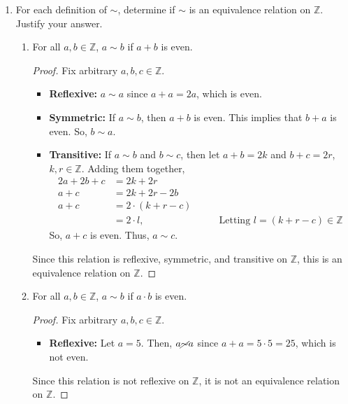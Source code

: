 \documentclass{article}
\begin{document}
\begin{enumerate}
	\item For each definition of $\sim$, determine if $\sim$ is an equivalence relation on $\mathbb{Z}$.  Justify your answer.
		\begin{enumerate}

			\item For all $a, b \in \mathbb{Z}$, $a \sim b$ if $a + b$ is even.
                    \begin{proof} Fix arbitrary $a, b, c \in \mathbb{Z}$.
                        \begin{itemize}
                            \item \textbf{Reflexive:}  $a \sim a$ since $a + a = 2a$, which is even.
                            \item \textbf{Symmetric:}  If $a \sim b$, then $a + b$ is even. This implies that $b + a$ is even. So, $b \sim a$.
                            \item \textbf{Transitive:} If $a \sim b$ and $b \sim c$, then let $a + b = 2k$ and $b + c = 2r$, $k, r\in \mathbb{Z}$. Adding them together,
                            \begin{alignat*}{2}
                                a + 2b + c &= 2k + 2r \\
                                a + c &= 2k + 2r - 2b \\
                                a + c &= 2\cdot(k + r - c) \\
                                &= 2\cdot l\text{,}&\qquad \textrm{Letting $l = (k + r - c)\in\mathbb{Z}$}
                            \end{alignat*}
                            So, $a + c$ is even. Thus, $a \sim c$.
                        \end{itemize}
                        Since this relation is reflexive, symmetric, and transitive on $\mathbb{Z}$, this is an equivalence relation on $\mathbb{Z}$.
                    \end{proof}

			\item For all $a, b \in \mathbb{Z}$, $a \sim b$ if $a \cdot b$ is even.
                    \begin{proof} Fix arbitrary $a, b, c \in \mathbb{Z}$.
                        \begin{itemize}
                            \item \textbf{Reflexive:} Let $a = 5$. Then, $a \cancel{\sim} a$ since $a + a = 5 \cdot 5 = 25$, which is not even.
                        \end{itemize}
                        Since this relation is not reflexive on $\mathbb{Z}$, it is not an equivalence relation on $\mathbb{Z}$.
                    \end{proof}


\end{enumerate}
\end{enumerate}
\end{document}
